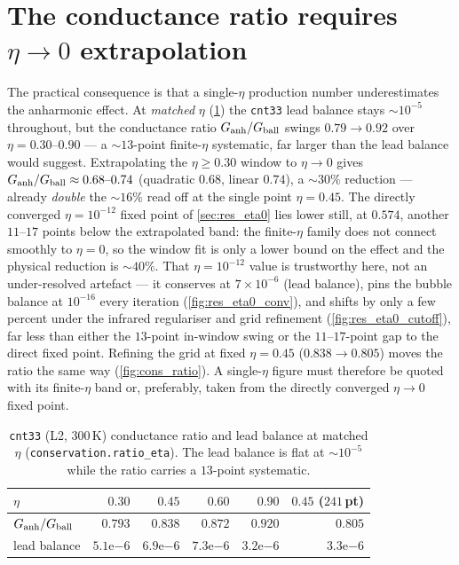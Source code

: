 \section{The conductance ratio requires \texorpdfstring{$\eta\to0$}{eta to 0}
extrapolation}
\label{sec:cons_ratio}

The practical consequence is that a single-$\eta$ production number
underestimates the anharmonic effect. At \emph{matched} $\eta$
(\cref{tab:cons_ratio}) the \texttt{cnt33} lead balance stays $\sim10^{-5}$
throughout, but the conductance ratio $G_{\rm anh}/G_{\rm ball}$ swings
$0.79\to0.92$ over $\eta=0.30\text{--}0.90$ --- a $\sim13$-point finite-$\eta$
systematic, far larger than the lead balance would suggest. Extrapolating the
$\eta\ge0.30$ window to $\eta\to0$ gives
$G_{\rm anh}/G_{\rm ball}\approx0.68\text{--}0.74$ (quadratic $0.68$, linear
$0.74$), a $\sim30\%$ reduction --- already \emph{double} the $\sim16\%$ read
off at the single point $\eta=0.45$. The directly converged $\eta=10^{-12}$
fixed point of \cref{sec:res_eta0} lies lower still, at $0.574$, another
$11$--$17$ points below the extrapolated band: the finite-$\eta$ family does
not connect smoothly to $\eta=0$, so the window fit is only a lower bound on
the effect and the physical reduction is $\sim40\%$. That $\eta=10^{-12}$ value
is trustworthy here, not an under-resolved artefact --- it conserves at
$7\times10^{-6}$ (lead balance), pins the bubble balance at $10^{-16}$ every
iteration (\cref{fig:res_eta0_conv}), and shifts by only a few percent under
the infrared regulariser and grid refinement (\cref{fig:res_eta0_cutoff}), far
less than either the $13$-point in-window swing or the $11$--$17$-point gap to
the direct fixed point. Refining the grid at fixed $\eta=0.45$
($0.838\to0.805$) moves the ratio the same way (\cref{fig:cons_ratio}). A
single-$\eta$ figure must therefore be quoted with its finite-$\eta$ band or,
preferably, taken from the directly converged $\eta\to0$ fixed point.

\begin{table}[t]
  \centering
  \caption{\texttt{cnt33} (L2, $300$\,K) conductance ratio and lead balance at
    matched $\eta$ (\texttt{conservation.ratio\_eta}). The lead balance is
    flat at $\sim10^{-5}$ while the ratio carries a $13$-point systematic.}
  \label{tab:cons_ratio}
  \begin{tabular}{lrrrrr}
    \toprule
    $\eta$ & $0.30$ & $0.45$ & $0.60$ & $0.90$ & $0.45$ ($241$\,pt)\\
    \midrule
    $G_{\rm anh}/G_{\rm ball}$ & $0.793$ & $0.838$ & $0.872$ & $0.920$ & $0.805$\\
    lead balance & $5.1\mathrm{e}{-6}$ & $6.9\mathrm{e}{-6}$ & $7.3\mathrm{e}{-6}$ & $3.2\mathrm{e}{-6}$ & $3.3\mathrm{e}{-6}$\\
    \bottomrule
  \end{tabular}
\end{table}

